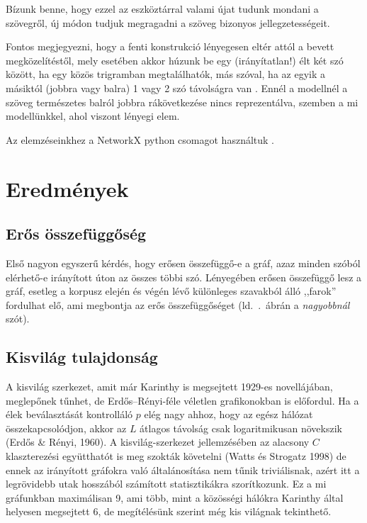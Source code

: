 \documentclass{llncs}
\newcommand{\nyil}{$\rightarrow$\ }
\newcommand{\embf}[1]{\textbf{#1}}
\newcommand{\XXX}[1]{{\small \color{megjcolor} [XXX #1]}}
\newcommand{\XXXb}[1]{\XXX{\embf{#1}}}
\begin{document}
Bízunk benne, hogy ezzel az eszköztárral
valami újat tudunk mondani a szövegről,
új módon tudjuk megragadni a szöveg bizonyos jellegzetességeit.

Fontos megjegyezni, hogy a fenti konstrukció lényegesen eltér
attól a bevett megközelítéstől,
mely esetében akkor húzunk be egy (irányítatlan!) élt
két szó között, ha egy közös trigramban megtalálhatók,
más szóval, ha az egyik a másiktól (jobbra vagy balra)
1 vagy 2 szó távolságra van
\cite{cancho2001thesmall}.
Ennél a modellnél a szöveg természetes balról jobbra rákövetkezése
nincs reprezentálva,
szemben a mi modellünkkel, ahol viszont lényegi elem.

Az elemzéseinkhez a NetworkX python csomagot használtuk
\cite{hagberg2008exploring}.



\section{Eredmények}

\subsection{Erős összefüggőség}
Első nagyon egyszerű kérdés, hogy erősen összefüggő-e a gráf,
azaz minden szóból elérhető-e irányított úton az összes többi szó.
Lényegében erősen összefüggő lesz a gráf,
esetleg a korpusz elején és végén lévő
különleges szavakból álló ,,farok'' fordulhat elő,
ami megbontja az erős összefüggőséget
(ld.\ .\ ábrán a \emph{nagyobbnál} szót).

\subsection{Kisvilág tulajdonság}
A kisvilág szerkezet, amit már  Karinthy is megsejtett 1929-es
  novellájában, meglepőnek tűnhet, de Erdős--Rényi-féle véletlen grafikonokban
    is előfordul. Ha a élek beválasztását kontrolláló $p$ elég nagy ahhoz, hogy
    az egész hálózat összekapcsolódjon, akkor az $L$ átlagos távolság csak
    logaritmikusan növekszik (Erdős \& Rényi, 1960). A kisvilág-szerkezet
    jellemzésében az alacsony $C$ klaszterezési együtthatót is meg szokták
    követelni (Watts és Strogatz 1998) de ennek az irányított gráfokra való
    általánosítása nem tűnik triviálisnak, azért itt a legrövidebb utak
    hosszából számított statisztikákra szorítkozunk. Ez a mi gráfunkban
    maximálisan 9, ami több, mint a közösségi hálókra Karinthy által helyesen
    megsejtett 6, de megítélésünk szerint még kis világnak tekinthető.
    
\end{document}
